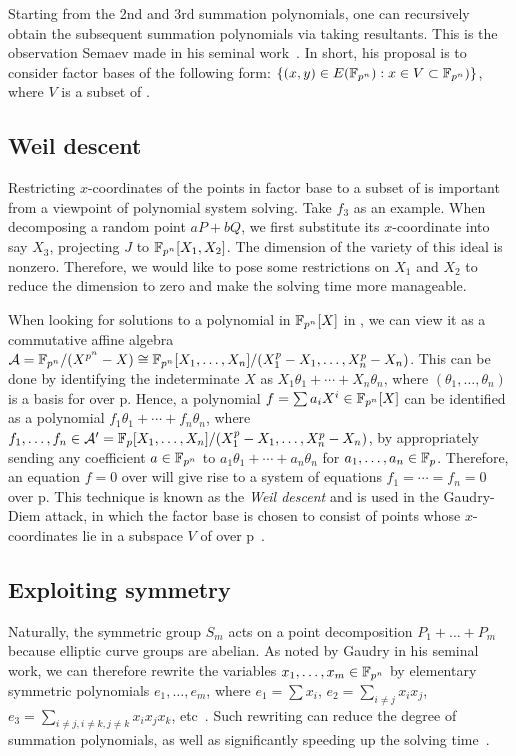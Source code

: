 Starting from the 2nd and 3rd summation polynomials, one can
recursively obtain the subsequent summation polynomials via taking
resultants.
%
This is the observation Semaev made in his seminal
work~\cite{DBLP:journals/iacr/Semaev04}.
%
In short, his proposal is to consider factor bases of the following
form: $\{(x,y)\in E(\mathbb F_{p^n}):x\in V\subset\mathbb F_{p^n})\}$, where $V$ is a
subset of .

\subsection{Weil descent}
%
Restricting $x$-coordinates of the points in factor base to a subset
of  is important from a viewpoint of polynomial system solving.
%
Take $f_3$ as an example.
%
When decomposing a random point $aP+bQ$, we first substitute its
$x$-coordinate into say $X_3$, projecting $J$ to $\mathbb F_{p^n}[X_1,X_2]$.
%
The dimension of the variety of this ideal is nonzero.
%
Therefore, we would like to pose some restrictions on $X_1$ and $X_2$
to reduce the dimension to zero and make the solving time more
manageable.

When looking for solutions to a polynomial in $\mathbb F_{p^n}[X]$ in ,
we can view it as a commutative affine algebra
$\mathcal A=\mathbb F_{p^n}/(X^{p^n} - X)\cong\mathbb F_{p^n}[X_1,\ldots,X_n]/(X_1^p -
X_1,\ldots,X_n^p - X_n)$.
%
This can be done by identifying the indeterminate $X$ as
$X_1\theta_1+\cdots+X_n\theta_n$, where $(\theta_1,\ldots,\theta_n)$
is a basis for  over \F p.
%
Hence, a polynomial $f=\sum a_iX^i\in\mathbb F_{p^n}[X]$ can be identified as
a polynomial $f_1\theta_1+\cdots+f_n\theta_n$, where
$f_1,\ldots,f_n\in\mathcal A'=\mathbb F_{p}[X_1,\ldots,X_n]/(X_1^p -
X_1,\ldots,X_n^p - X_n)$, by appropriately sending any coefficient
$a\in\mathbb F_{p^n}$ to $a_1\theta_1+\cdots+a_n\theta_n$ for
$a_1,\ldots,a_n\in\mathbb F_{p}$.
%
Therefore, an equation $f=0$ over  will give rise to a system
of equations $f_1=\cdots=f_n=0$ over \F p.
%
This technique is known as the \emph{Weil descent} and is used in the
Gaudry-Diem attack, in which the factor base is chosen to consist of
points whose $x$-coordinates lie in a subspace $V$ of  over \F
p~\cite{DBLP:journals/jsc/Gaudry09,DBLP:journals/moc/Diem11}.

\subsection{Exploiting symmetry}
%
\label{sec:exploit-symmetry}
%
Naturally, the symmetric group $S_m$ acts on a point decomposition
$P_1+\ldots+P_m$ because elliptic curve groups are abelian.
%
As noted by Gaudry in his seminal work, we can therefore rewrite the
variables $x_1,\ldots,x_m\in\mathbb F_{p^n}$ by elementary symmetric
polynomials $e_1,\ldots,e_m$, where $e_1=\sum x_i$,
$e_2=\sum_{i\neq j}x_ix_j$,
$e_3=\sum_{i\neq j,i\neq k,j\neq k}x_ix_jx_k$,
etc~\cite{DBLP:journals/jsc/Gaudry09}.
%
Such rewriting can reduce the degree of summation polynomials, as well
as significantly speeding up the solving
time~\cite{DBLP:conf/eurocrypt/FaugerePPR12,DBLP:conf/iwsec/HuangPST13}.

